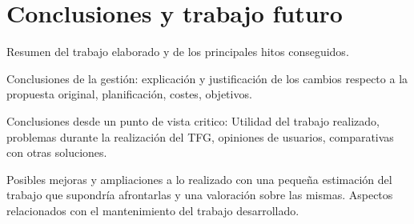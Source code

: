 \chapter{Conclusiones y trabajo futuro}
Resumen del trabajo elaborado y de los principales hitos conseguidos.

Conclusiones de la gestión: explicación y justificación de 
los cambios respecto a la propuesta original, planificación, 
costes, objetivos.

Conclusiones desde un punto de vista critico: Utilidad del 
trabajo realizado, problemas durante la realización del TFG, 
opiniones de usuarios, comparativas con otras soluciones.

Posibles mejoras y ampliaciones a lo realizado con una 
pequeña estimación del trabajo que supondría afrontarlas 
y una valoración sobre las mismas. Aspectos relacionados con el
 mantenimiento del trabajo desarrollado.